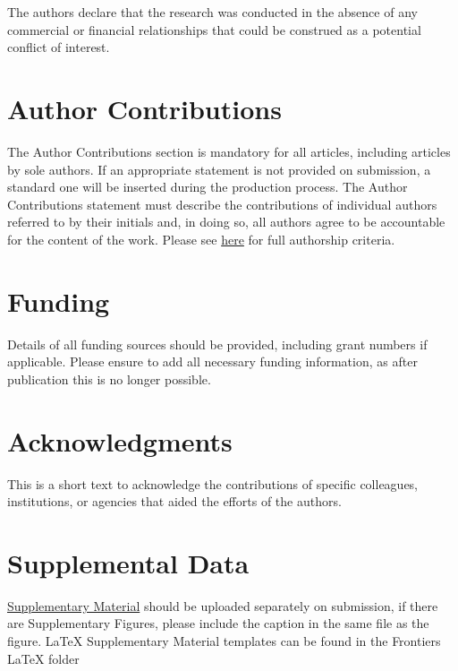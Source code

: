 \documentclass[utf8]{frontiersSCNS} %
\begin{document}
The authors declare that the research was conducted in the absence of any commercial or financial relationships that could be construed as a potential conflict of interest.

\section*{Author Contributions}

The Author Contributions section is mandatory for all articles, including articles by sole authors. If an appropriate statement is not provided on submission, a standard one will be inserted during the production process. The Author Contributions statement must describe the contributions of individual authors referred to by their initials and, in doing so, all authors agree to be accountable for the content of the work. Please see  \href{http://home.frontiersin.org/about/author-guidelines#AuthorandContributors}{here} for full authorship criteria.

\section*{Funding}
Details of all funding sources should be provided, including grant numbers if applicable. Please ensure to add all necessary funding information, as after publication this is no longer possible.

\section*{Acknowledgments}
This is a short text to acknowledge the contributions of specific colleagues, institutions, or agencies that aided the efforts of the authors.

\section*{Supplemental Data}
 \href{http://home.frontiersin.org/about/author-guidelines#SupplementaryMaterial}{Supplementary Material} should be uploaded separately on submission, if there are Supplementary Figures, please include the caption in the same file as the figure. LaTeX Supplementary Material templates can be found in the Frontiers LaTeX folder 




\end{document}
